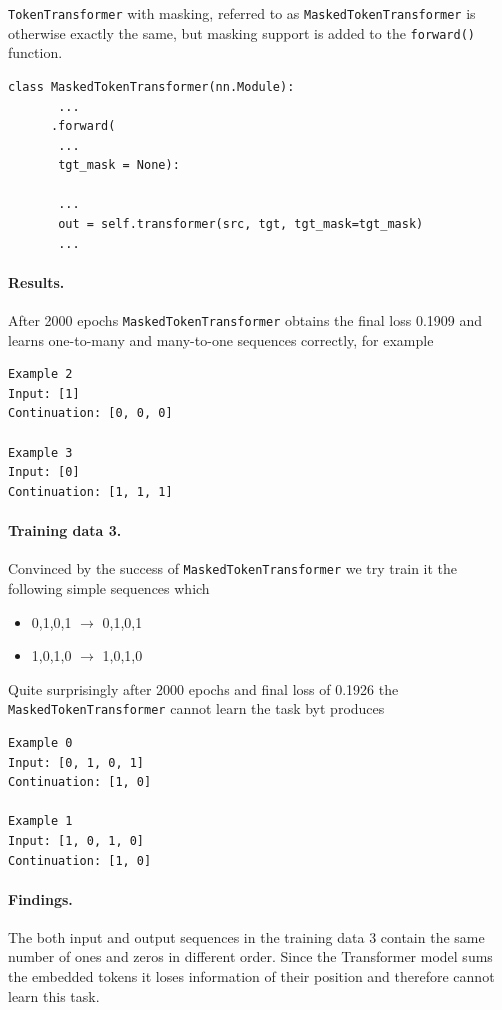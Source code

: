 \documentclass[final]{article}
\begin{document}
\texttt{TokenTransformer} with masking, referred to as \texttt{MaskedTokenTransformer} is otherwise exactly the same, but masking support is added to the \texttt{forward()} function.
\begin{lstlisting}
class MaskedTokenTransformer(nn.Module):
       ...
      .forward(
       ...
       tgt_mask = None):

       ...
       out = self.transformer(src, tgt, tgt_mask=tgt_mask)
       ...
\end{lstlisting}


\paragraph{Results.}
After 2000 epochs \texttt{MaskedTokenTransformer} obtains the final loss 0.1909 and learns one-to-many and many-to-one sequences correctly, for example
\begin{verbatim}
Example 2
Input: [1]
Continuation: [0, 0, 0]

Example 3
Input: [0]
Continuation: [1, 1, 1]
\end{verbatim}


\paragraph{Training data 3.} Convinced by the success of \texttt{MaskedTokenTransformer} we try train it the following simple sequences which
\begin{itemize}
  \item 0,1,0,1 $\rightarrow$ 0,1,0,1
  \item 1,0,1,0 $\rightarrow$ 1,0,1,0
\end{itemize}

Quite surprisingly after 2000 epochs and final loss of 0.1926 the \texttt{MaskedTokenTransformer} cannot learn the task byt produces
\begin{verbatim}
Example 0
Input: [0, 1, 0, 1]
Continuation: [1, 0]

Example 1
Input: [1, 0, 1, 0]
Continuation: [1, 0]
\end{verbatim}

\paragraph{Findings.}
The both input and output sequences in the training data 3 contain the same number of ones and zeros in different order. Since the Transformer model sums the embedded tokens it loses information of their position and therefore cannot learn this task.
\end{document}
